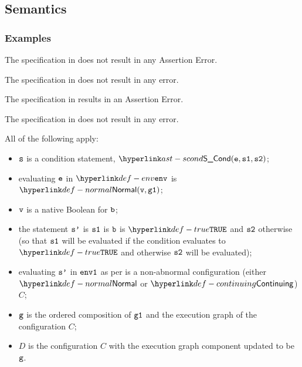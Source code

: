 \subsection{Semantics}
\subsubsection{Examples}
The specification in  does not result in any Assertion Error.

The specification in 
does not result in any error.

The specification in 
results in an Assertion Error.

The specification in  does not result in any error.

\ProseParagraph
All of the following apply:
\begin{itemize}
\item $\texttt{s}$ is a condition statement, $\SCond(\ve, \vsone, \vstwo)$;
\item evaluating $\texttt{e}$ in $\env$ is $\Normal(\vv, \vgone)$\ProseOrAbnormal;
\item $\texttt{v}$ is a native Boolean for $\texttt{b}$;
\item the statement $\texttt{s'}$ is $\texttt{s1}$ is $\texttt{b}$ is $\True$ and $\texttt{s2}$ otherwise
(so that $\texttt{s1}$ will be evaluated if the condition evaluates to $\True$ and otherwise
$\texttt{s2}$ will be evaluated);
\item evaluating $\texttt{s'}$ in $\texttt{env1}$ as per  is a non-abnormal configuration
      (either $\Normal$ or $\Continuing$) $C$\ProseOrAbnormal;
\item $\texttt{g}$ is the ordered composition of $\texttt{g1}$ and the execution graph of the configuration $C$;
\item $D$ is the configuration $C$ with the execution graph component updated to be $\texttt{g}$.
\end{itemize}

